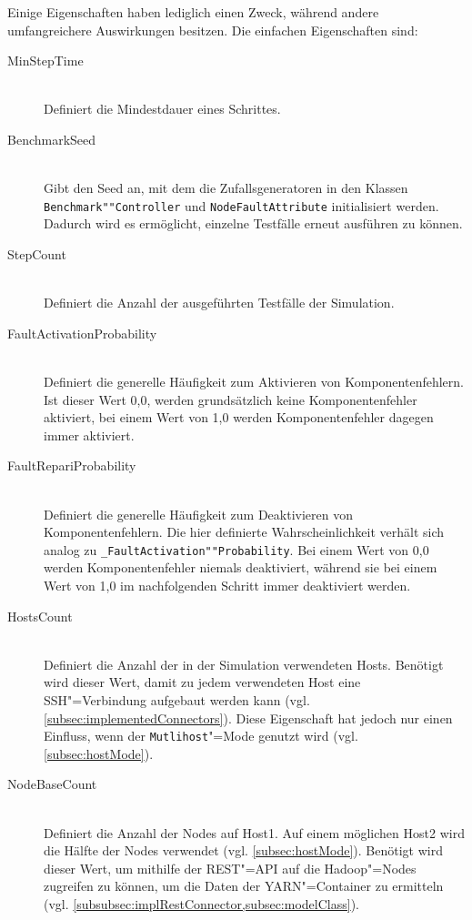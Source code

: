 Einige Eigenschaften haben lediglich einen Zweck, während andere umfangreichere Auswirkungen besitzen.
Die einfachen Eigenschaften sind:

\begin{description}
    \item [MinStepTime] \hfill \\
        Definiert die Mindestdauer eines Schrittes.
        
    \item[BenchmarkSeed] \hfill \\
        Gibt den Seed an, mit dem die Zufallsgeneratoren in den Klassen \texttt{Benchmark""Controller} und \texttt{NodeFaultAttribute} initialisiert werden.
        Dadurch wird es ermöglicht, einzelne Testfälle erneut ausführen zu können.
        
    \item[StepCount] \hfill \\
        Definiert die Anzahl der ausgeführten Testfälle der Simulation.
        
    \item[FaultActivationProbability] \hfill \\
        Definiert die generelle Häufigkeit zum Aktivieren von Komponentenfehlern.
        Ist dieser Wert 0,0, werden grundsätzlich keine Komponentenfehler aktiviert, bei einem Wert von 1,0 werden Komponentenfehler dagegen immer aktiviert.
        
    \item[FaultRepariProbability] \hfill \\
        Definiert die generelle Häufigkeit zum Deaktivieren von Komponentenfehlern.
        Die hier definierte Wahrscheinlichkeit verhält sich analog zu \texttt{\_FaultActivation""Probability}.
        Bei einem Wert von 0,0 werden Komponentenfehler niemals deaktiviert, während sie bei einem Wert von 1,0 im nachfolgenden Schritt immer deaktiviert werden.
        
    \item[HostsCount] \hfill \\
        Definiert die Anzahl der in der Simulation verwendeten Hosts.
        Benötigt wird dieser Wert, damit zu jedem verwendeten Host eine SSH"=Verbindung aufgebaut werden kann (vgl. \cref{subsec:implementedConnectors}).
        Diese Eigenschaft hat jedoch nur einen Einfluss, wenn der \texttt{Mutlihost}"=Mode genutzt wird (vgl. \cref{subsec:hostMode}).
        
    \item[NodeBaseCount] \hfill \\
        Definiert die Anzahl der Nodes auf Host1.
        Auf einem möglichen Host2 wird die Hälfte der Nodes verwendet (vgl. \cref{subsec:hostMode}).
        Benötigt wird dieser Wert, um mithilfe der REST"=API auf die Hadoop"=Nodes zugreifen zu können, um die Daten der YARN"=Container zu ermitteln (vgl. \cref{subsubsec:implRestConnector,subsec:modelClass}).
        

\end{description}

